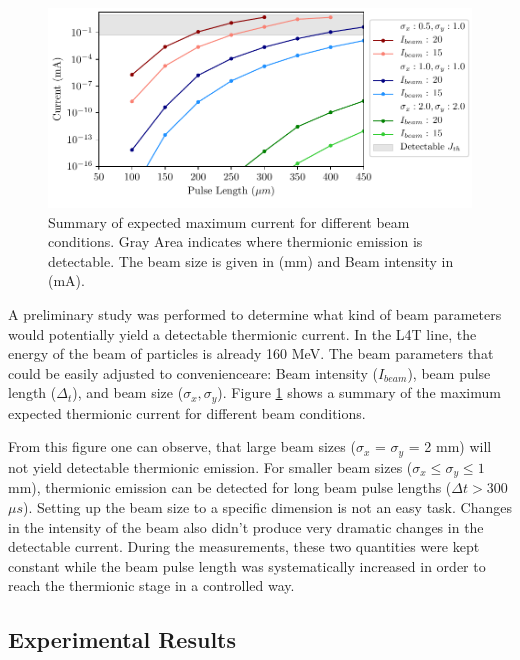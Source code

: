 \begin{figure}[h]
    \centering
    \includegraphics[width=1.0\columnwidth]{Figure_IsThereThermo/IsThereThermo.pdf}
    \caption{Summary of expected maximum current for different beam conditions. Gray Area indicates where thermionic emission is detectable. The beam size is given in (mm) and Beam intensity in (mA).}
    \label{fig:Jth_Cond}
\end{figure}

A preliminary study was performed to determine what kind of beam parameters would potentially yield a detectable thermionic current. In the L4T line, the energy of the \hm beam of particles is already 160 MeV. The beam parameters that could be easily adjusted to convenienceare: Beam intensity ($I_{beam}$), beam pulse length ($\Delta_t$), and beam size ($\sigma_x , \sigma_y$). Figure \ref{fig:Jth_Cond} shows a summary of the maximum expected thermionic current for different beam conditions. 

From this figure one can observe, that large beam sizes ($\sigma_x$ = $\sigma_y$ = 2 mm) will not yield detectable thermionic emission. For smaller beam sizes ($\sigma_x \leq \sigma_y \leq 1$ mm), thermionic emission can be detected for long beam pulse lengths ($\Delta t > 300 $ $\mu s$). Setting up the beam size to a specific dimension is not an easy task. Changes in the intensity of the beam also didn't produce very dramatic changes in the detectable current. During the measurements, these two quantities were kept constant while the beam pulse length was systematically increased in order to reach the thermionic stage in a controlled way. 

\subsection{Experimental Results}

